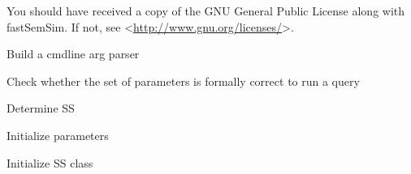 \documentclass[letterpaper,10pt,english]{sphinxmanual}
\begin{document}
You should have received a copy of the GNU General Public License
along with fastSemSim.  If not, see \textless{}\href{http://www.gnu.org/licenses/}{http://www.gnu.org/licenses/}\textgreater{}.

\begin{fulllineitems}
\label{fastsemsim:fastsemsim.fastsemsim_cmdline.build_cmdline_args_parser}
Build a cmdline arg parser

\end{fulllineitems}


\begin{fulllineitems}
\label{fastsemsim:fastsemsim.fastsemsim_cmdline.check_parameters}
Check whether the set of parameters is formally correct to run a query

\end{fulllineitems}


\begin{fulllineitems}
\label{fastsemsim:fastsemsim.fastsemsim_cmdline.det_ss}
Determine SS

\end{fulllineitems}


\begin{fulllineitems}
\label{fastsemsim:fastsemsim.fastsemsim_cmdline.init_parameters}
Initialize parameters

\end{fulllineitems}


\begin{fulllineitems}
\label{fastsemsim:fastsemsim.fastsemsim_cmdline.init_ss}
Initialize SS class

\end{fulllineitems}
\end{document}
